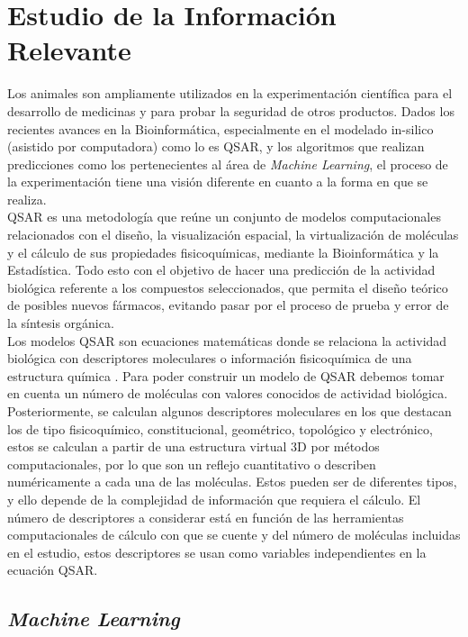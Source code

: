 \section{Estudio de la Información Relevante}{
\noindent Los animales son ampliamente utilizados en la experimentación científica para el desarrollo de medicinas y para probar la seguridad de otros productos. Dados los recientes avances en la Bioinformática, especialmente en el modelado in-silico (asistido por computadora) como lo es QSAR, y los algoritmos que realizan predicciones como los pertenecientes al área de \textit{Machine Learning}, el proceso de la experimentación tiene una visión diferente en cuanto a la forma en que se realiza.\\

\noindent QSAR es una metodología que reúne un conjunto de modelos computacionales relacionados con el diseño, la visualización espacial, la virtualización de moléculas y el cálculo de sus propiedades fisicoquímicas, mediante la Bioinformática y la Estadística. Todo esto con el objetivo de hacer una predicción de la actividad biológica referente a los compuestos seleccionados, que permita el diseño teórico de posibles nuevos fármacos, evitando pasar por el proceso de prueba y error de la síntesis orgánica.\\

\noindent Los modelos QSAR son ecuaciones matemáticas donde se relaciona la actividad biológica con descriptores moleculares o información fisicoquímica de una estructura química \cite{anex_1}. Para poder construir un modelo de QSAR debemos tomar en cuenta un número de moléculas con valores conocidos de actividad biológica.
Posteriormente, se calculan algunos descriptores moleculares en los que destacan los de tipo fisicoquímico, constitucional, geométrico, topológico y electrónico, estos se calculan a partir de una estructura virtual 3D por métodos computacionales, por lo que son un reflejo cuantitativo o describen numéricamente a cada una de las moléculas. Estos pueden ser de diferentes tipos, y ello depende de la complejidad de información que requiera el cálculo. El número de descriptores a considerar está en función de las herramientas computacionales de cálculo con que se cuente y del número de moléculas incluidas en el estudio, estos descriptores se usan como
variables independientes en la ecuación QSAR.\\

\subsection{\textit{Machine Learning}}

}
